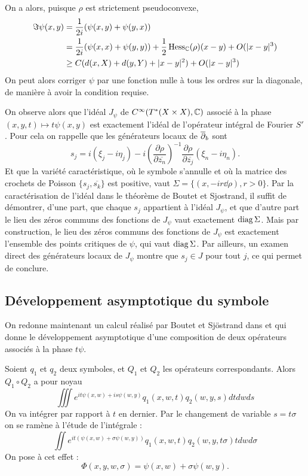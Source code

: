 On a alors, puisque $\rho$ est strictement pseudoconvexe,
\begin{align*}
	\Im \psi (x,y) &= \frac{1}{2i}(\psi(x,y)+\psi(y,x)) \\
	&= \frac{1}{2i}(\psi(x,x)+\psi(y,y)) + \frac{1}{2}\operatorname{Hess}_{\mathbb{C}}(\rho)(x-y)+O(|x-y|^3)\\
	&\geq C(d(x,X)+d(y,Y) + |x-y|^2) + O(|x-y|^3)
\end{align*}
On peut alors corriger $\psi$ par une fonction nulle à tous les ordres sur la diagonale, de manière à avoir la condition requise.

On observe alors  que l'idéal $J_{\psi}$ de $C^{\infty}(T^*(X\times X), \mathbb{C})$ associé à la phase$(x,y,t)\mapsto t\psi(x,y)$ est exactement l'idéal de l'opérateur intégral de Fourier $S'$. Pour cela on rappelle que les générateurs locaux de $\overline{\partial}_b$ sont
\begin{equation*}
s_j = i(\xi_j - i \eta_j) - i\left(\frac{\partial \rho}{\partial \overline{z_n}}\right)^{-1}\frac{\partial \rho}{\partial \overline{z_j}}(\xi_n - i \eta_n).
\end{equation*}
Et que la variété caractéristique, où le symbole s'annulle et où la matrice des crochets de Poisson $\{s_j,\overline{s_k} \}$ est positive, vaut $\Sigma=\{(x,-ir\dd \rho), r>0\}$. Par la caractérisation de l'idéal dans le théorème de Boutet et Sjostrand, il suffit de démontrer, d'une part, que chaque $s_j$ appartient à l'idéal $J_{\psi}$, et que d'autre part le lieu des zéros communs des fonctions de $J_{\psi}$ vaut exactement $\operatorname{diag} \Sigma$. Mais par construction, le lieu des zéros communs des fonctions de $J_{\psi}$ est exactement l'ensemble des points critiques de $\psi$, qui vaut $\operatorname{diag} \Sigma$. Par ailleurs, un examen direct des générateurs locaux de $J_{\psi}$ montre que $s_j \in J$ pour tout $j$, ce qui permet de conclure.

\subsection{Développement asymptotique du symbole}
On redonne maintenant un calcul réalisé par Boutet et Sjöstrand dans \cite{BoutetdeMonvel1975} et qui donne le développement asymptotique d'une composition de deux opérateurs associés à la phase $t\psi$.

Soient $q_1$ et $q_2$ deux symboles, et $Q_1$ et $Q_2$ les opérateurs correspondants. Alors $Q_1\circ Q_2$ a pour noyau
\begin{equation*}
  \iiint e^{it\psi(x,w)+is\psi(w,y)}q_1(x,w,t)q_2(w,y,s)dtdwds
\end{equation*}
On va intégrer par rapport à $t$ en dernier. Par le changement de variable $s=t\sigma$ on se ramène à l'étude de l'intégrale :
\begin{equation*}
  \iint e^{it(\psi(x,w)+\sigma \psi(w,y))}q_1(x,w,t)q_2(w,y,t\sigma)tdwd\sigma
\end{equation*}
On pose à cet effet :
\begin{equation*}
  \Phi(x,y,w,\sigma)=\psi(x,w)+\sigma \psi(w,y).
\end{equation*}

